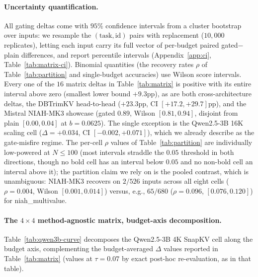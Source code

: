\documentclass{article}
\begin{document}
\paragraph{Uncertainty quantification.} All gating deltas come with $95\%$
confidence intervals from a cluster bootstrap over inputs: we resample the
$(\text{task}, \text{id})$ pairs with replacement ($10{,}000$ replicates),
letting each input carry its full vector of per-budget paired
gated$-$plain differences, and report percentile intervals
(Appendix~\ref{app:ci}, Table~\ref{tab:matrix-ci}). Binomial quantities (the
recovery rates $\rho$ of Table~\ref{tab:partition} and single-budget
accuracies) use Wilson score intervals. Every one of the $16$ matrix deltas
in Table~\ref{tab:matrix} is positive with its entire interval above zero
(smallest lower bound $+9.3$pp), as are both cross-architecture deltas, the
DBTrimKV head-to-head ($+23.3$pp, CI $[+17.2, +29.7]$pp), and the Mistral
NIAH-MK3 showcase (gated $0.89$, Wilson $[0.81, 0.94]$, disjoint from plain
$[0.00, 0.04]$ at $b = 0.0625$). The single exception is the Qwen2.5-3B 16K
scaling cell ($\Delta = +0.034$, CI $[-0.002, +0.071]$), which we already
describe as the gate-misfire regime. The per-cell $\rho$ values of
Table~\ref{tab:partition} are individually low-powered at $N \le 100$ (most
intervals straddle the $0.05$ threshold in both directions, though no bold
cell has an interval below $0.05$ and no non-bold cell an interval above
it); the partition claim we rely on is the pooled contrast, which is
unambiguous: NIAH-MK3 recovers on $2/526$ inputs across all eight cells
($\rho = 0.004$, Wilson $[0.001, 0.014]$) versus, e.g., $65/680$
($\rho = 0.096$, $[0.076, 0.120]$) for niah\_multivalue.

\paragraph{The $4 \times 4$ method-agnostic matrix, budget-axis
decomposition.} Table~\ref{tab:qwen3b-curve} decomposes the Qwen2.5-3B 4K
SnapKV cell along the budget axis, complementing the budget-averaged
$\Delta$ values reported in Table~\ref{tab:matrix} (values at $\tau = 0.07$
by exact post-hoc re-evaluation, as in that table).
\end{document}
